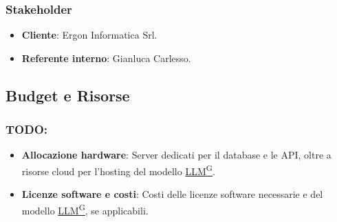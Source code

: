 \documentclass{article}
\begin{document}
        \subsubsection{Stakeholder}
        \begin{itemize}
            \item \textbf{Cliente}: Ergon Informatica Srl.
            \item \textbf{Referente interno}: Gianluca Carlesso.
        \end{itemize}

    \subsection{Budget e Risorse}
        \subsubsection{TODO: }
        \begin{itemize}
            \item \textbf{Allocazione hardware}: Server dedicati per il database e le API, oltre a risorse cloud per l'hosting del modello \href{https://code7crusaders.github.io/docs/RTB/documentazione_interna/glossario.html#llm-large-language-model}{LLM\textsuperscript{G}}.
            \item \textbf{Licenze software e costi}: Costi delle licenze software necessarie e del modello \href{https://code7crusaders.github.io/docs/RTB/documentazione_interna/glossario.html#llm-large-language-model}{LLM\textsuperscript{G}}, se applicabili.
        \end{itemize}
\end{document}

